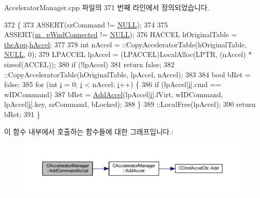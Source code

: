 Accelerator\+Manager.\+cpp 파일의 371 번째 라인에서 정의되었습니다.


\begin{DoxyCode}
372 \{
373   ASSERT(szCommand != \mbox{\hyperlink{getopt1_8c_a070d2ce7b6bb7e5c05602aa8c308d0c4}{NULL}});
374 
375   ASSERT(\mbox{\hyperlink{class_c_accelerator_manager_a24f706c75f754982051e1d7fad1916da}{m\_pWndConnected}} != \mbox{\hyperlink{getopt1_8c_a070d2ce7b6bb7e5c05602aa8c308d0c4}{NULL}});
376   HACCEL hOriginalTable = \mbox{\hyperlink{_v_b_a_8cpp_a8095a9d06b37a7efe3723f3218ad8fb3}{theApp}}.\mbox{\hyperlink{class_v_b_a_a6ca8052bfc1574a9ef8ca4482563e1e3}{hAccel}};
377 
378   \textcolor{keywordtype}{int} nAccel = ::CopyAcceleratorTable(hOriginalTable, \mbox{\hyperlink{getopt1_8c_a070d2ce7b6bb7e5c05602aa8c308d0c4}{NULL}}, 0);
379   LPACCEL lpAccel = (LPACCEL)LocalAlloc(LPTR, (nAccel) * \textcolor{keyword}{sizeof}(ACCEL));
380   \textcolor{keywordflow}{if} (!lpAccel)
381     \textcolor{keywordflow}{return} \textcolor{keyword}{false};
382   ::CopyAcceleratorTable(hOriginalTable, lpAccel, nAccel);
383 
384   \textcolor{keywordtype}{bool} bRet = \textcolor{keyword}{false};
385   \textcolor{keywordflow}{for} (\textcolor{keywordtype}{int} \mbox{\hyperlink{expr-lex_8cpp_acb559820d9ca11295b4500f179ef6392}{i}} = 0; \mbox{\hyperlink{expr-lex_8cpp_acb559820d9ca11295b4500f179ef6392}{i}} < nAccel; \mbox{\hyperlink{expr-lex_8cpp_acb559820d9ca11295b4500f179ef6392}{i}}++) \{
386     \textcolor{keywordflow}{if} (lpAccel[\mbox{\hyperlink{expr-lex_8cpp_acb559820d9ca11295b4500f179ef6392}{i}}].cmd == wIDCommand)
387       bRet = \mbox{\hyperlink{class_c_accelerator_manager_ac9e0e988625c9687666a9f582f9b3536}{AddAccel}}(lpAccel[\mbox{\hyperlink{expr-lex_8cpp_acb559820d9ca11295b4500f179ef6392}{i}}].fVirt, wIDCommand, lpAccel[\mbox{\hyperlink{expr-lex_8cpp_acb559820d9ca11295b4500f179ef6392}{i}}].key, szCommand, bLocked);
388   \}
389   ::LocalFree(lpAccel);
390   \textcolor{keywordflow}{return} bRet;
391 \}
\end{DoxyCode}
이 함수 내부에서 호출하는 함수들에 대한 그래프입니다.\+:
\nopagebreak
\begin{figure}[H]
\begin{center}
\leavevmode
\includegraphics[width=350pt]{class_c_accelerator_manager_a05227e733c2c5d4a4d8074bf28a4f333_cgraph}
\end{center}
\end{figure}
